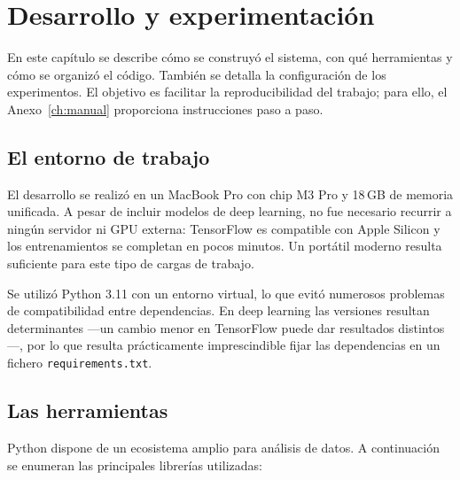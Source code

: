 \chapter{Desarrollo y experimentación}
\label{ch:desarrollo}

En este capítulo se describe cómo se construyó el sistema, con qué herramientas y cómo se organizó el código. También se detalla la configuración de los experimentos. El objetivo es facilitar la reproducibilidad del trabajo; para ello, el Anexo~\ref{ch:manual} proporciona instrucciones paso a paso.

\section{El entorno de trabajo}

El desarrollo se realizó en un MacBook Pro con chip M3 Pro y 18\,GB de memoria unificada. A pesar de incluir modelos de deep learning, no fue necesario recurrir a ningún servidor ni GPU externa: TensorFlow es compatible con Apple Silicon y los entrenamientos se completan en pocos minutos. Un portátil moderno resulta suficiente para este tipo de cargas de trabajo.

Se utilizó Python 3.11 con un entorno virtual, lo que evitó numerosos problemas de compatibilidad entre dependencias. En deep learning las versiones resultan determinantes ---un cambio menor en TensorFlow puede dar resultados distintos---, por lo que resulta prácticamente imprescindible fijar las dependencias en un fichero \texttt{requirements.txt}.

\section{Las herramientas}

Python dispone de un ecosistema amplio para análisis de datos. A continuación se enumeran las principales librerías utilizadas:


